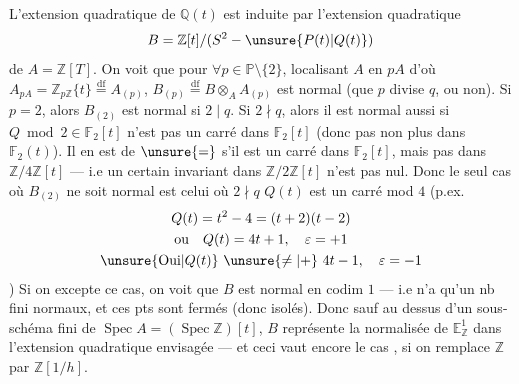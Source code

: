 L'extension quadratique de $\mathbb Q(t)$ est induite par
l'extension quadratique
\[
B=\mathbb Z[t]/(S^2-\unsure{P(t)|Q(t)})
\]
de $A=\mathbb Z[T]$. On voit que pour $\forall p\in\mathbb P\setminus\{2\}$,
localisant $A$ en $pA$ d'où $A_{pA}=\mathbb Z_{p\mathbb Z}\{t\}\overset{\mathrm{df}}=A_{(p)}$,
 $B_{(p)}\overset{\mathrm{df}}=B\otimes_A A_{(p)}$ est normal (que $p$ divise $q$, ou non).
Si $p=2$, alors $B_{(2)}$ est normal si $2\mid q$. Si $2\nmid q$, alors
il est normal aussi si $Q\bmod 2\in\mathbb F_2[t]$ n'est pas un carré
dans $\mathbb F_2[t]$ (donc pas non plus dans $\mathbb F_2(t)$).  Il en est
de $\unsure{=}$ s'il est un carré dans $\mathbb F_2[t]$, mais pas dans
$\mathbb Z/4\mathbb Z[t]$ --- i.e un certain invariant dans $\mathbb Z/2\mathbb Z[t]$ n'est pas nul.
Donc le seul cas où $B_{(2)}$ ne soit normal est celui où $2\nmid q$
 $Q(t)$ est un carré mod $4$ (p.ex.
\[
\begin{gathered}
Q(t)=t^2-4=(t+2)(t-2)\\
\text{ou}\quad Q(t)=4t+1,\quad\varepsilon=+1\\
\unsure{\text{Oui}|Q(t)}\ \unsure{\ne|+}\ 4t-1,\quad\varepsilon=-1
\end{gathered}
\]
)
Si on excepte ce cas, on voit que $B$ est normal en
codim $1$ --- i.e  n'a qu'un nb fini
 
normaux, et ces pts sont fermés (donc isolés). Donc  sauf
 au dessus d'un sous-schéma fini de $\operatorname{Spec}A=(\operatorname{Spec}\mathbb Z)[t]$,
$B$ représente la normalisée de $\mathbb E^1_{\mathbb Z}$ dans l'extension
quadratique envisagée --- et ceci vaut encore le cas
, si on remplace $\mathbb Z$ par $\mathbb Z[1/h]$.
